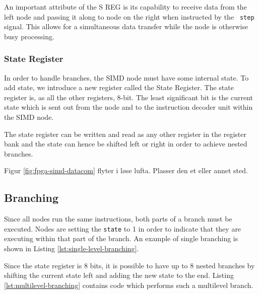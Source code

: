 An important attribute of the S REG is its capability to receive data from the
left node and passing it along to node on the right when instructed by the {\tt
  step} signal. This allows for a simultaneous data transfer while the node is
otherwise busy processing.

\subsubsection{State Register}
In order to handle branches, the \ac{SIMD} node must have some internal
state. To add state, we introduce a new register called the State Register. The
state register is, as all the other registers, 8-bit. The least significant bit
is the current state which is sent out from the node and to the instruction
decoder unit within the \ac{SIMD} node.

The state register can be written and read as any other register in the register
bank and the state can hence be shifted left or right in order to achieve nested
branches.


{\sc \color{red} Figur \ref{fig:fpga-simd-datacom} flyter i løse lufta. Plasser
  den et eller annet sted.}

\subsection{Branching}
Since all nodes run the same instructions, both parts of a branch must be
executed. Nodes are setting the {\tt state} to 1 in order to indicate that they
are executing within that part of the branch. An example of single branching is
shown in Listing \ref{lst:single-level-branching}.



Since the state register is 8 bits, it is possible to have up to 8 nested
branches by shifting the current state left and adding the new state to the
end. Listing \ref{lst:multilevel-branching} contains code which performs such a
multilevel branch.


